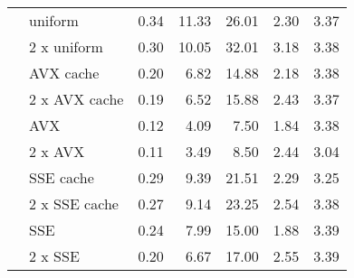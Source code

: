 \documentclass{stdlocal}
\begin{document}
\begin{tabular}{llrrrrr}
  & uniform & 0.34 & 11.33 &    26.01 & 2.30 & 3.37 \\
  & 2 x uniform & 0.30 & 10.05 &    32.01 & 3.18 & 3.38 \\
  & AVX cache & 0.20 &  6.82 &    14.88 & 2.18 & 3.38 \\
  & 2 x AVX cache & 0.19 &  6.52 &    15.88 & 2.43 & 3.37 \\
  & AVX & 0.12 &  4.09 &     7.50 & 1.84 & 3.38 \\
  & 2 x AVX & 0.11 &  3.49 &     8.50 & 2.44 & 3.04 \\
  & SSE cache & 0.29 &  9.39 &    21.51 & 2.29 & 3.25 \\
  & 2 x SSE cache & 0.27 &  9.14 &    23.25 & 2.54 & 3.38 \\
  & SSE & 0.24 &  7.99 &    15.00 & 1.88 & 3.39 \\
  & 2 x SSE & 0.20 &  6.67 &    17.00 & 2.55 & 3.39 \\
  \hline
\end{tabular}
\end{document}
